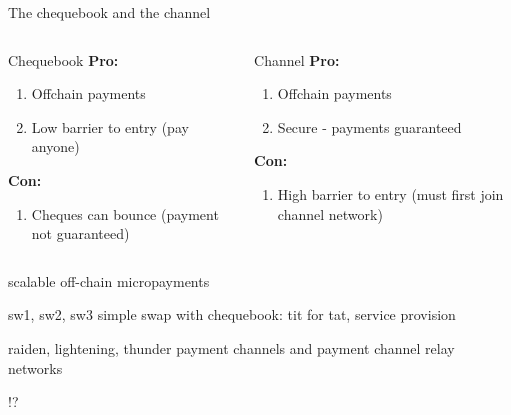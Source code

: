 \begin{frame}{The chequebook and the channel}
\begin{overlayarea}{\textwidth}{5.2cm}
\begin{columns}[t]
    \begin{block}{Chequebook}
      \textbf{Pro:}
      \begin{enumerate}
       \item<1>{Offchain payments}
       \item<2>{Low barrier to entry (pay anyone)}
      \end{enumerate}
      \textbf{Con:}
      \begin{enumerate}
       \item<3>{Cheques can bounce (payment not guaranteed)}
      \end{enumerate}
    \end{block}
    \begin{block}{Channel}
      \textbf{Pro:}
      \begin{enumerate}
       \item<1>{Offchain payments}
       \item<3>{Secure - payments guaranteed}
      \end{enumerate}
      \textbf{Con:}
      \begin{enumerate}
       \item<2>{High barrier to entry (must first join channel network)}
      \end{enumerate}
    \end{block}
\end{columns}
\end{overlayarea}
\end{frame}



\begin{frame}{scalable off-chain micropayments}
\begin{block}{sw1, sw2, sw3}
simple swap with chequebook: tit for tat, service provision
\end{block}
\begin{block}{raiden, lightening, thunder}
payment channels and payment channel relay networks
\end{block}
\begin{block}{!?}
\end{block}
\end{frame}


